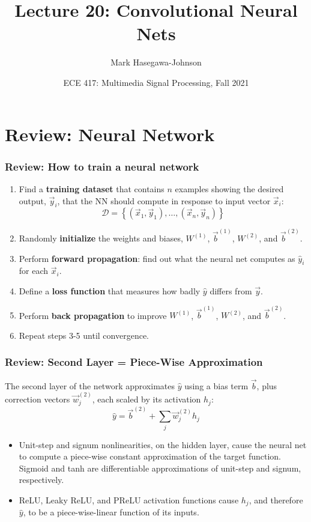 \documentclass{beamer}
\title{Lecture 20: Convolutional Neural Nets}
\author{Mark Hasegawa-Johnson}
\date{ECE 417: Multimedia Signal Processing, Fall 2021}
\begin{document}
\begin{frame}
  \maketitle
\end{frame}

\begin{frame}
  \tableofcontents
\end{frame}


\section[Review]{Review: Neural Network}
\setcounter{subsection}{1}

\begin{frame}
  \frametitle{Review: How to train a neural network}
  \begin{enumerate}
  \item Find a {\bf training dataset} that contains $n$ examples showing the
    desired output, $\vec{y}_i$, that the NN should compute in
    response to input vector $\vec{x}_i$:
    \[
    {\mathcal D}=\left\{(\vec{x}_1,\vec{y}_1),\ldots,(\vec{x}_n,\vec{y}_n)\right\}
    \]
    \item Randomly {\bf initialize} the weights and biases, $W^{(1)}$,
      $\vec{b}^{(1)}$, $W^{(2)}$, and $\vec{b}^{(2)}$.
    \item Perform {\bf forward propagation}: find out what the neural
      net computes as $\hat{y}_i$ for each $\vec{x}_i$.
    \item Define a {\bf loss function} that measures
      how badly $\hat{y}$ differs from $\vec{y}$.
    \item Perform {\bf back propagation} to improve $W^{(1)}$,
      $\vec{b}^{(1)}$, $W^{(2)}$, and $\vec{b}^{(2)}$.
    \item Repeat steps 3-5 until convergence.
  \end{enumerate}
\end{frame}

\begin{frame}
  \frametitle{Review: Second Layer = Piece-Wise Approximation}

  The second layer of the network approximates $\hat{y}$ using a bias term $\vec{b}$,
  plus correction vectors $\vec{w}_j^{(2)}$, each scaled by its activation $h_j$:
  \[
  \hat{y} = \vec{b}^{(2)} + \sum_j \vec{w}_{j}^{(2)} h_j
  \]
  \begin{itemize}
  \item Unit-step and signum nonlinearities, on the hidden layer,
    cause the neural net to compute a piece-wise constant approximation
    of the target function. Sigmoid and tanh are differentiable approximations of
    unit-step and signum, respectively.
  \item ReLU, Leaky ReLU, and PReLU activation functions cause $h_j$,
    and therefore $\hat{y}$, to be a piece-wise-linear function of its
    inputs.
  \end{itemize}
\end{frame}
\end{document}
